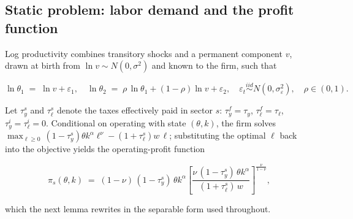 \documentclass[12pt]{article}
\begin{document}
\subsection{Static problem: labor demand and the profit function}
\label{sec:toy-static}

Log productivity combines transitory shocks and a permanent component $v$, drawn at birth from $\ln v\sim N(0,\sigma^{2})$ and known to the firm, such that
 
\begin{equation}
  \ln\theta_{1} \;=\; \ln v + \varepsilon_{1},
  \quad
  \ln\theta_{2} \;=\; \rho\,\ln\theta_{1} + (1-\rho)\ln v +
  \varepsilon_{2},
  \quad \varepsilon_{t}\stackrel{iid}{\sim} N(0,\sigma_{\varepsilon}^{2}),
  \quad \rho\in(0,1).
  \label{eq:toy-theta}
\end{equation}
 
Let $\tau_y^{s}$ and $\tau_{\ell}^{s}$ denote the taxes effectively paid in sector $s$: $\tau_y^{f}=\tau_y$, $\tau_{\ell}^{f}=\tau_{\ell}$, $\tau_y^{i}=\tau_{\ell}^{i}=0$. Conditional on operating with state $(\theta,k)$, the firm solves $\max_{\ell\geq0}\,(1-\tau_y^{s})\theta k^{\alpha}\ell^{\nu} - (1+\tau_{\ell}^{s})w\,\ell$; substituting the optimal $\ell$ back into the objective yields the operating-profit function

\begin{equation*}
  \pi_{s}(\theta,k)
  \;=\;(1-\nu)\,(1-\tau_y^{s})\,\theta k^{\alpha}
  \left[\frac{\nu\,(1-\tau_y^{s})\,\theta k^{\alpha}}
             {(1+\tau_{\ell}^{s})\,w}\right]^{\frac{\nu}{1-\nu}},
\end{equation*}

which the next lemma rewrites in the separable form used throughout.
 
\end{document}
